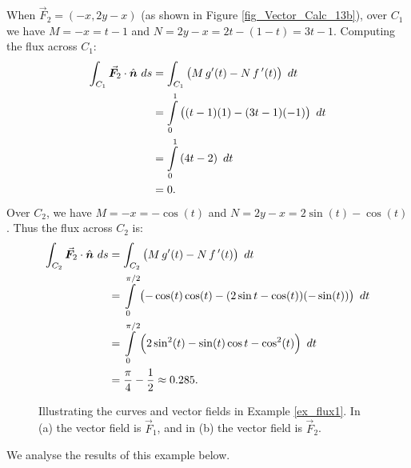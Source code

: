 \begin{example}
When $ \vec F_2 = \left( -x,2y-x\right)$ (as shown in Figure \ref{fig_Vector_Calc_13b}), over $C_1$ we have $M = -x = t-1$ and $N = 2y-x = 2t-(1-t) = 3t-1$. Computing the flux across $C_1$:
\begin{align*}
\int_{C_1} \vec F_2\cdot \hat n\ ds & = \int_{C_1} \left(M\,g'(t) - N\,\fp(t)\right)\ dt\\
			&= \int\limits_0^1 \left( (t-1)(1) - (3t-1)(-1)\right)\ dt \\
			&= \int\limits_0^1 \left(4t-2\right)\ dt\\
			&= 0.
\end{align*}
Over $C_2$, we have $M = -x = -\cos (t)$ and $N = 2y-x = 2\sin (t)-\cos (t)$. Thus the flux across $C_2$ is:
\begin{align*}
\int_{C_2} \vec F_2\cdot \hat n\ ds & = \int_{C_2} \left(M\,g'(t) - N\,\fp(t)\right)\ dt\\
				&= \int\limits_0^{\pi/2}\left( -\cos (t)\cos (t) - (2\sin t-\cos (t))(-\sin (t))\right)\ dt\\
				&= \int\limits_0^{\pi/2} \left(2\sin^2 (t)-\sin (t)\cos t-\cos^2(t)\right)\ dt\\
				&=\dfrac{\pi}{4} - \dfrac{1}{2}\approx 0.285.
\end{align*}
\begin{figure}[H]
\centering
\qquad
{}
\caption{Illustrating the curves and vector fields in Example \ref{ex_flux1}. In (a) the vector field is $\vec F_1$, and in (b) the vector field is $\vec F_2$.}
\end{figure}
We analyse the results of this example below.
\end{example}



